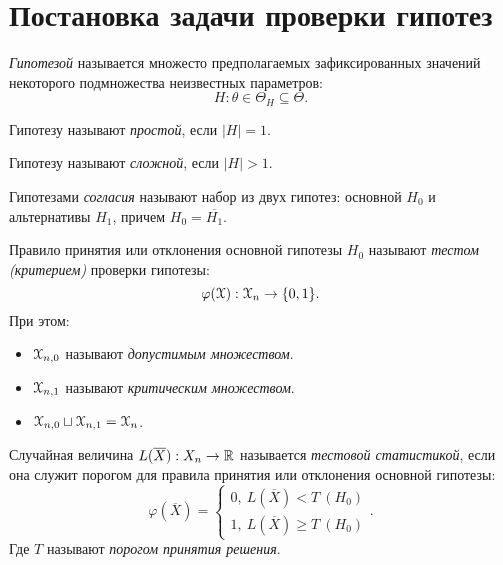 \section{Постановка задачи проверки гипотез}

\begin{definition}
	\textit{Гипотезой} называется множесто предполагаемых зафиксированных значений
	некоторого подмножества неизвестных параметров:
	\[
		H: \theta \in \Theta_{H} \subseteq \Theta
	.\]
\end{definition}

\begin{definition}
	Гипотезу называют \textit{простой}, если $|H| = 1$.
\end{definition}

\begin{definition}
	Гипотезу называют \textit{сложной}, если $|H| > 1$.
\end{definition}

\begin{definition}
	Гипотезами \textit{согласия} называют набор из двух гипотез: основной $H_0$ и
	альтернативы $H_1$, причем $H_0 = \overline{H_1}$.
\end{definition}

\begin{definition}
	Правило принятия или отклонения основной гипотезы $H_0$ называют
	\textit{тестом (критерием)} проверки гипотезы:
	\[
		\varphi(\mathcal{X}): \mathcal{X}_{n} \to \{0, 1\}
	.\]
	При этом:
	\begin{itemize}
		\item $\mathcal{X}_{n, 0}$ называют \textit{допустимым множеством}.
		\item $\mathcal{X}_{n, 1}$ называют \textit{критическим множеством}.
		\item $\mathcal{X}_{n, 0} \sqcup \mathcal{X}_{n, 1} = \mathcal{X}_{n}$.
	\end{itemize}
\end{definition}

\begin{definition}
	Случайная величина $L(\overline{X}): X_n \to \mathbb{R}$ называется
	\textit{тестовой статистикой}, если она служит порогом для правила принятия
	или отклонения основной гипотезы:
	\[
		\varphi(\overline{X}) = \begin{cases}
			0,~ L(\overline{X}) < T \> (H_0) \\
			1,~ L(\overline{X}) \geqslant T \> (H_0)
		\end{cases}
	.\]
	Где $T$ называют \textit{порогом принятия решения}.
\end{definition}
